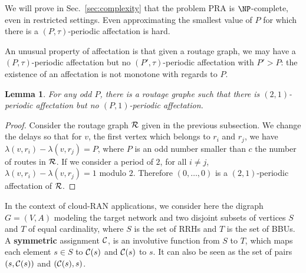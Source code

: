 \documentclass[a4paper,10pt]{article}
\newtheorem{lemma}[theorem]{Lemma}
\begin{document}
      We will prove in Sec.~\ref{sec:complexity} that the problem PRA is $\NP$-complete, even in restricted settings.
      Even approximating the smallest value of $P$ for which there is a $(P,\tau)$-periodic affectation is hard.

      An unusual property of affectation is that given a routage graph, we may have a $(P,\tau)$-periodic affectation but no
      $(P',\tau)$-periodic affectation with $P' > P$: the existence of an affectation is not monotone with regards to $P$.

	\begin{lemma} 
	 For any odd $P$, there is a routage graphe such that there is $(2,1)$-periodic affectation but no $(P,1)$-periodic affectation.
	\end{lemma}
\begin{proof}

      Consider the routage graph ${\cal R}$ given in the previous subsection. 
      We change the delays so that for $v$, the first vertex which belongs to $r_i$ and $r_j$,
      we have $\lambda(v,r_i) - \lambda(v,r_j)= P$, where $P$ is an odd number smaller than $c$ the number of routes in ${\cal R}$.
      If we consider a period of $2$, for all $i \neq j$, $\lambda(v,r_i) - \lambda(v,r_j) = 1 $ modulo $2$. Therefore $(0,\dots,0)$ is a $(2,1)$-periodic affectation of ${\cal R}$.

      
\end{proof}
      
% 

      
      In the context of cloud-RAN applications, we consider here the digraph $G=(V,A)$ modeling the target network 
      and two disjoint subsets of vertices $S$ and $T$ of equal cardinality, where $S$ is the set of RRHs and $T$ is the set of BBUs. 
      A \textbf{symmetric} assignment ${\cal C}$, is an involutive function from $S$ to $T$, which maps each element $s\in S$ to ${\cal C}(s)$ and ${\cal C}(s)$ to $s$. It can also be seen as the set of pairs $(s,{\cal C}(s))$ and $({\cal C}(s),s)$.
     
\end{document}
